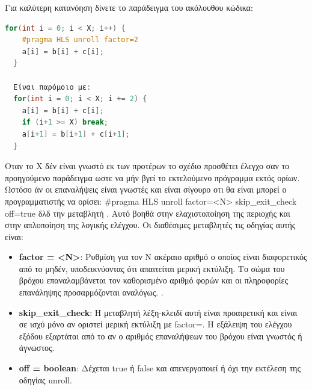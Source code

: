 Για καλύτερη κατανόηση δίνετε το παράδειγμα του ακόλουθου κώδικα:
\begin{lstlisting}[language=C++, caption={Παράδειγμα χρήσης οδηγίας Unrolling}]
  for(int i = 0; i < X; i++) {
    #pragma HLS unroll factor=2
    a[i] = b[i] + c[i];
  }

  Είναι παρόμοιο με:
  for(int i = 0; i < X; i += 2) {
    a[i] = b[i] + c[i];
    if (i+1 >= X) break;
    a[i+1] = b[i+1] + c[i+1];
  }
\end{lstlisting}

Οταν το Χ δέν είναι γνωστό εκ των προτέρων το σχέδιο προσθέτει έλεγχο σαν το προηγούμενο παράδειγμα ωστε να μήν βγεί το εκτελούμενο πρόγραμμα εκτός ορίων.
Ωστόσο άν οι επαναλήψεις είναι γνωστές και είναι σίγουρο οτι θα είναι  μπορεί ο προγραμματιστής να ορίσει:
\#pragma HLS unroll factor=<N> skip\_exit\_check off=true δλδ την μεταβλητή .
Αυτό βοηθά στην ελαχιστοποίηση της περιοχής και στην απλοποίηση της λογικής ελέγχου. Οι διαθέσιμες μεταβλητές τις οδηγίας αυτής είναι:

\begin{itemize}
  \item \textbf{factor = <N>}: Ρυθμίση για τον Ν ακέραιο αριθμό ο οποίος είναι διαφορετικός από το μηδέν, υποδεικνύοντας ότι απαιτείται μερική εκτύλιξη.
  Το σώμα του βρόχου επαναλαμβάνεται τον καθορισμένο αριθμό φορών και οι πληροφορίες επανάληψης προσαρμόζονται αναλόγως. .
  \item \textbf{skip\_exit\_check}: Η μεταβλητή λέξη-κλειδί αυτή είναι προαιρετική και είναι σε ισχύ μόνο αν οριστεί μερική εκτύλιξη με factor=.
  Η εξάλειψη του ελέγχου εξόδου εξαρτάται από το αν ο αριθμός επαναλήψεων του βρόχου είναι γνωστός ή άγνωστος.
  \item \textbf{off = boolean}: Δέχεται true ή false και απενεργοποιεί ή όχι την εκτέλεση της οδηγίας unroll.
\end{itemize}

